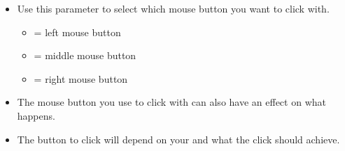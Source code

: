 \begin{itemize}
\item Use this parameter to select which mouse button you want to click with.
\begin{itemize}
\item {} = left mouse button
\item {} = middle mouse button
\item {} = right mouse button
\end{itemize}
\item The mouse button you use to click with can also have an effect on what happens. 
\item The button to click will depend on your \gdaut{} and what the click should achieve.
\end{itemize}

    
